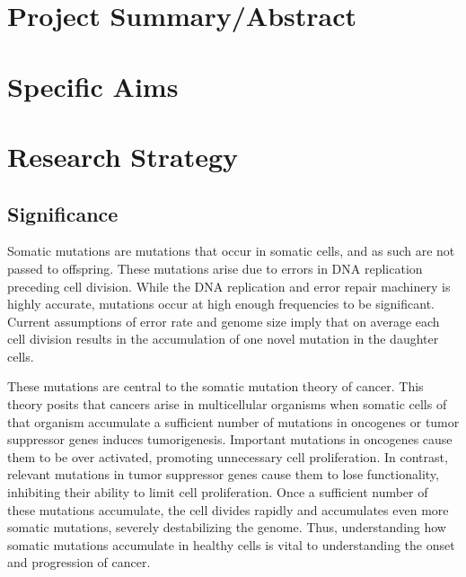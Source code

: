 



\section{Project Summary/Abstract} %



\clearpage

\section{Specific Aims} %



\clearpage

\section{Research Strategy} %


\subsection{Significance}

Somatic mutations are mutations that occur in somatic cells, and as such are not passed to offspring.
These mutations arise due to errors in DNA replication preceding cell division.
While the DNA replication and error repair machinery is highly accurate, mutations occur at high enough frequencies to be significant.
Current assumptions of error rate and genome size imply that on average each cell division results in the accumulation of one novel mutation in the daughter cells.

These mutations are central to the somatic mutation theory of cancer.
This theory posits that cancers arise in multicellular organisms when somatic cells of that organism accumulate a sufficient number of mutations in oncogenes or tumor suppressor genes induces tumorigenesis.
Important mutations in oncogenes cause them to be over activated, promoting unnecessary cell proliferation.
In contrast, relevant mutations in tumor suppressor genes cause them to lose functionality, inhibiting their ability to limit cell proliferation.
Once a sufficient number of these mutations accumulate, the cell divides rapidly and accumulates even more somatic mutations, severely destabilizing the genome.
Thus, understanding how somatic mutations accumulate in healthy cells is vital to understanding the onset and progression of cancer. 

